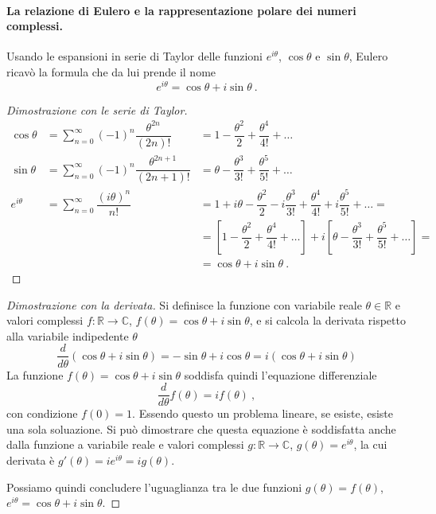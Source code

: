 \paragraph{La relazione di Eulero e la rappresentazione polare dei numeri complessi.} Usando le espansioni in serie di Taylor delle funzioni $e^{i\theta}$, $\cos \theta$ e $\sin \theta$, Eulero ricavò la formula che da lui prende il nome
\begin{equation}
  e^{i \theta} = \cos \theta + i \sin \theta \ .
\end{equation}
\begin{proof}[Dimostrazione con le serie di Taylor]
\begin{equation}
\begin{array}{rll}
   \cos \theta  & = \sum_{n=0}^{\infty} (-1)^n \dfrac{\theta^{2n}}{(2n)!} & = 1 - \dfrac{\theta^2}{2} + \dfrac{\theta^4}{4!} + \dots \\
   \sin \theta  & = \sum_{n=0}^{\infty} (-1)^n \dfrac{\theta^{2n+1}}{(2n+1)!} & = \theta - \dfrac{\theta^3}{3!} + \dfrac{\theta^5}{5!} + \dots \\
   e^{i \theta} & = \sum_{n=0}^{\infty} \dfrac{(i\theta)^n}{n!} & = 1 + i\theta - \dfrac{\theta^2}{2} - i \dfrac{\theta^3}{3!} + \dfrac{\theta^4}{4!} + i \dfrac{\theta^5}{5!} +  \dots = \\
  & & = \left[  1 - \dfrac{\theta^2}{2} + \dfrac{\theta^4}{4!} + \dots \right] + i \left[ \theta - \dfrac{\theta^3}{3!} + \dfrac{\theta^5}{5!} + \dots \right]  = \\
  & & = \cos \theta + i \sin \theta \ .
\end{array}
\end{equation}
\end{proof}
%
\begin{proof}[Dimostrazione con la derivata] Si definisce la funzione con variabile reale $\theta \in \mathbb{R}$ e valori complessi $f: \mathbb{R} \rightarrow \mathbb{C}$, $f(\theta) = \cos \theta + i \sin \theta$, e si calcola la derivata rispetto alla variabile indipedente $\theta$
\begin{equation}
    \dfrac{d}{d \theta} \left( \cos \theta + i \sin \theta \right) = -\sin \theta + i \cos \theta = i \left( \cos \theta + i \sin \theta \right)
\end{equation}
    La funzione $f(\theta) = \cos \theta + i \sin \theta$ soddisfa quindi l'equazione differenziale
\begin{equation}
    \dfrac{d}{d \theta} f(\theta) = i f(\theta) \ ,
\end{equation}
    con condizione $f(0) = 1$. Essendo questo un problema lineare, se esiste, esiste una sola soluazione. Si può dimostrare che questa equazione è soddisfatta anche dalla funzione a variabile reale e valori complessi $g: \mathbb{R} \rightarrow \mathbb{C}$, $g(\theta) = e^{i\theta}$, la cui derivata è $g'(\theta) = i e^{i\theta} = i g(\theta)$.

    \noindent
    Possiamo quindi concludere l'uguaglianza tra le due funzioni $g(\theta) = f(\theta)$, $e^{i \theta} = \cos \theta + i \sin \theta$.
\end{proof}

